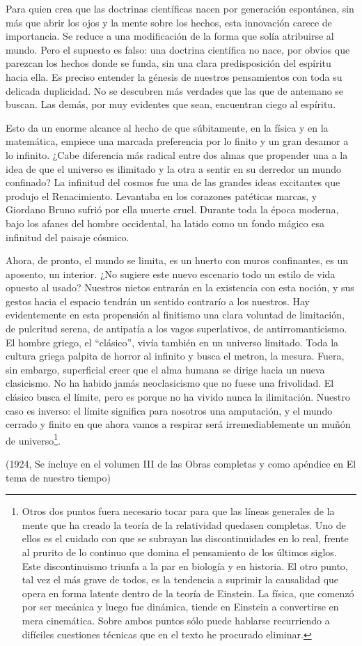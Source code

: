 \documentclass[a4paper, 12pt]{article}
\begin{document}
Para quien crea que las doctrinas científicas nacen por generación
espontánea, sin más que abrir los ojos y la mente sobre los hechos, esta
innovación carece de importancia. Se reduce a una modificación de la forma
que solía atribuirse al mundo. Pero el supuesto es falso: una doctrina
científica no nace, por obvios que parezcan los hechos donde se funda, sin
una clara predisposición del espíritu hacia ella. Es preciso entender la
génesis de nuestros pensamientos con toda su delicada duplicidad. No se
descubren más verdades que las que de antemano se buscan. Las demás, por
muy evidentes que sean, encuentran ciego al espíritu.

Esto da un enorme alcance al hecho de que súbitamente, en la física y en
la matemática, empiece una marcada preferencia por lo finito y un gran
desamor a lo infinito. ¿Cabe diferencia más radical entre dos almas que
propender una a la idea de que el universo es ilimitado y la otra a sentir
en su derredor un mundo confinado? La infinitud del cosmos fue una de las
grandes ideas excitantes que produjo el Renacimiento. Levantaba en los
corazones patéticas marcas, y Giordano Bruno sufrió por ella muerte cruel.
Durante toda la época moderna, bajo los afanes del hombre occidental, ha
latido como un fondo mágico esa infinitud del paisaje cósmico.

Ahora, de pronto, el mundo se limita, es un huerto con muros confinantes,
es un aposento, un interior. ¿No sugiere este nuevo escenario todo un
estilo de vida opuesto al usado? Nuestros nietos entrarán en la existencia
con esta noción, y sus gestos hacia el espacio tendrán un sentido
contrarío a los nuestros. Hay evidentemente en esta propensión al
finitismo una clara voluntad de limitación, de pulcritud serena, de
antipatía a los vagos superlativos, de antirromanticismo. El hombre
griego, el ``clásico'', vivía también en un universo limitado. Toda la
cultura griega palpita de horror al infinito y busca el metron, la mesura.
Fuera, sin embargo, superficial creer que el alma humana se dirige hacia
un nueva clasicismo. No ha habido jamás neoclasicismo que no fuese una
frivolidad. El clásico busca el límite, pero es porque no ha vivido nunca
la ilimitación. Nuestro caso es inverso: el límite significa para nosotros
una amputación, y el mundo cerrado y finito en que ahora vamos a respirar
será irremediablemente un muñón de universo\footnote{Otros dos puntos fuera necesario tocar para que las líneas generales
de la mente que ha creado la teoría de la relatividad quedasen completas.
Uno de ellos es el cuidado con que se subrayan las discontinuidades en lo
real, frente al prurito de lo continuo que domina el pensamiento de los
últimos siglos. Este discontinuismo triunfa a la par en biología y en
historia. El otro punto, tal vez el más grave de todos, es la tendencia a
suprimir la causalidad que opera en forma latente dentro de la teoría de
Einstein. La física, que comenzó por ser mecánica y luego fue dinámica,
tiende en Einstein a convertirse en mera cinemática. Sobre ambos puntos
sólo puede hablarse recurriendo a difíciles cuestiones técnicas que en el
texto he procurado eliminar.}.

\bigskip


(1924, Se incluye en el volumen III de las Obras completas y como apéndice
en El tema de nuestro tiempo)
\end{document}
